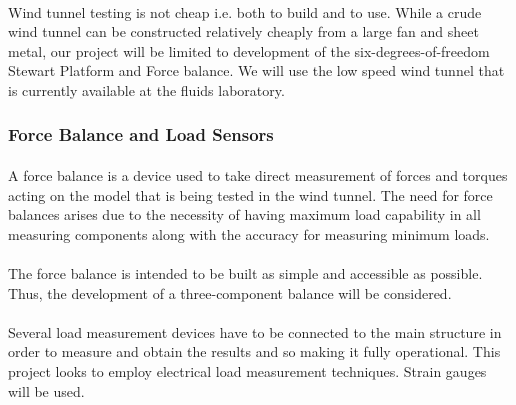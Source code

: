 \paragraph{}Wind tunnel testing is not cheap i.e. both to build and to use. While a crude wind tunnel can be constructed relatively cheaply from a large fan and
sheet metal, our project will be limited to development of the six-degrees-of-freedom Stewart Platform and Force balance. We will use the low speed wind tunnel that is currently available at the fluids laboratory.
\subsubsection{Force Balance and Load Sensors}
\paragraph{}A force balance is a device used to take direct measurement of forces and torques acting on the model that is being tested in the wind tunnel. The need for force balances arises due to the necessity of having maximum load capability in all measuring components along with the accuracy for measuring minimum loads. 
\cite{fernandes_design_nodate}
\paragraph{}The force balance is intended to be built as simple and accessible as possible. Thus, the development of a three-component balance will be considered.

\paragraph{}Several load measurement devices have to be connected to the main structure in order to measure and obtain the results and so making it fully operational. This project looks to employ electrical load measurement techniques. Strain gauges will be used.


